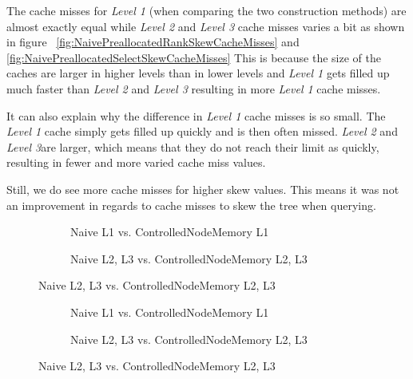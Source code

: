 The cache misses for \textit{Level 1} (when comparing the two construction methods) are almost exactly equal while \textit{Level 2} and \textit{Level 3} cache misses varies a bit as shown in figure ~\ref{fig:NaivePreallocatedRankSkewCacheMisses} and \ref{fig:NaivePreallocatedSelectSkewCacheMisses}
This is because the size of the caches are larger in higher levels than in lower levels and \textit{Level 1} gets filled up much faster than \textit{Level 2} and \textit{Level 3} resulting in more \textit{Level 1} cache misses.

It can also explain why the difference in \textit{Level 1} cache misses is so small. 
The \textit{Level 1} cache simply gets filled up quickly and is then often missed. \textit{Level 2} and \textit{Level 3}are larger, which means that they do not reach their limit as quickly, resulting in fewer and more varied cache miss values.

Still, we do see more cache misses for higher skew values.
This means it was not an improvement in regards to cache misses to skew the tree when querying.

\begin{figure}
\caption{Rank Cache Misses on Wavelet Tree with increasing skew}
\label{fig:NaiveControlledNodeMemoryRankSkewCacheMisses}
\centering
\begin{subfigure}{\textwidth}
	\caption{Naive L1 vs. ControlledNodeMemory L1}
	\label{fig:L1NaiveControlledNodeMemoryRankSkewCacheMisses}
	
	\vspace*{5 mm}
\end{subfigure}
\begin{subfigure}{\textwidth}
	\caption{Naive L2, L3 vs. ControlledNodeMemory L2, L3}
	\label{fig:L2L3NaiveControlledNodeMemoryRankSkewCacheMisses}
 	
\end{subfigure}
\end{figure}

\begin{figure}
\caption{Select Cache Misses on Wavelet Tree with increasing skew}
\label{fig:NaiveControlledNodeMemorySelectSkewCacheMisses}
\centering
\begin{subfigure}{\textwidth}
	\caption{Naive L1 vs. ControlledNodeMemory L1}
	\label{fig:L1NaiveControlledNodeMemorySelectSkewCacheMisses}
	
	\vspace*{5 mm}
\end{subfigure}
\begin{subfigure}{\textwidth}
	\caption{Naive L2, L3 vs. ControlledNodeMemory L2, L3}
	\label{fig:L2L3NaiveControlledNodeMemorySelectSkewCacheMisses}
 	
\end{subfigure}
\end{figure}


